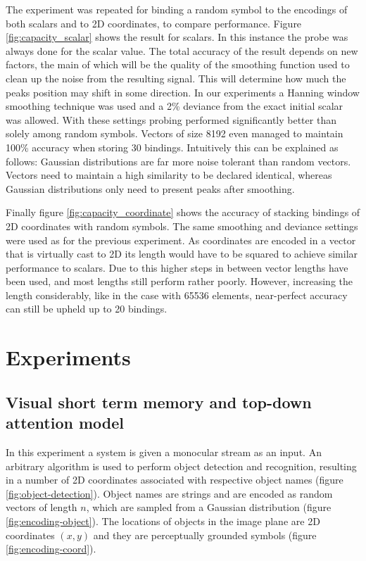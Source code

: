 \documentclass[journal]{journal}
\begin{document}
	The experiment was repeated for binding a random symbol to the encodings of both scalars and to 2D coordinates, to compare performance. Figure \ref{fig:capacity_scalar} shows the result for scalars. In this instance the probe was always done for the scalar value. The total accuracy of the result depends on new factors, the main of which will be the quality of the smoothing function used to clean up the noise from the resulting signal. This will determine how much the peaks position may shift in some direction. In our experiments a Hanning window smoothing technique was used and a 2\% deviance from the exact initial scalar was allowed. With these settings probing performed significantly better than solely among random symbols. Vectors of size 8192 even managed to maintain 100\% accuracy when storing 30 bindings. Intuitively this can be explained as follows: Gaussian distributions are far more noise tolerant than random vectors. Vectors need to maintain a high similarity to be declared identical, whereas Gaussian distributions only need to present peaks after smoothing. 
	
	Finally figure \ref{fig:capacity_coordinate} shows the accuracy of stacking bindings of 2D coordinates with random symbols. The same smoothing and deviance settings were used as for the previous experiment. As coordinates are encoded in a vector that is virtually cast to 2D its length would have to be squared to achieve similar performance to scalars. Due to this higher steps in between vector lengths have been used, and most lengths still perform rather poorly. However, increasing the length considerably, like in the case with 65536 elements, near-perfect accuracy can still be upheld up to 20 bindings.
		

		
	\section{Experiments}
	\label{sec:experiments}
	\subsection{Visual short term memory and top-down attention model}
	
	In this experiment a system is given a monocular stream as an input. An arbitrary algorithm is used to perform object detection and recognition, resulting in a number of 2D coordinates associated with respective object names (figure \ref{fig:object-detection}). Object names are strings and are encoded as random vectors of length $n$, which are sampled from a Gaussian distribution (figure \ref{fig:encoding-object}). The locations of objects in the image plane are 2D coordinates $(x,y)$ and they are perceptually grounded symbols (figure \ref{fig:encoding-coord}).
\end{document}
